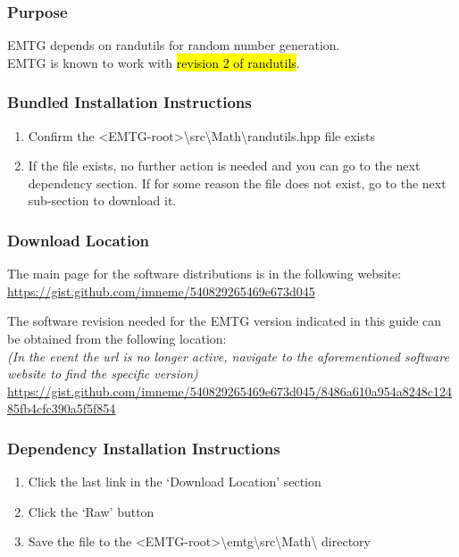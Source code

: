 
\subsubsection{Purpose}
\ac{EMTG} depends on randutils for random number generation. \\ \ac{EMTG} is known to work with \hl{revision 2 of randutils}.

\subsubsection{Bundled Installation Instructions}

\begin{enumerate}
	\item Confirm the \textless EMTG-root\textgreater \textbackslash src\textbackslash Math\textbackslash randutils.hpp \hspace{1pt} file exists
	\item If the file exists, no further action is needed and you can go to the next dependency section. If for some reason the file does not exist, go to the next sub-section to download it.
\end{enumerate}

\subsubsection{Download Location}
\noindent The main page for the software distributions is in the following website: \\
\url{https://gist.github.com/imneme/540829265469e673d045}

\noindent The software revision needed for the EMTG version indicated in this guide can be obtained from the following location: \\
\emph{(In the event the url is no longer active, navigate to the aforementioned software website to find the specific version)} \\
\url{https://gist.github.com/imneme/540829265469e673d045/8486a610a954a8248c12485fb4cfc390a5f5f854}

\subsubsection{Dependency Installation Instructions}
\begin{enumerate}
	\item Click the last link in the ‘Download Location’ section
	\item Click the ‘Raw’ button
	\item Save the file to the \textless EMTG-root\textgreater \textbackslash emtg\textbackslash src\textbackslash Math\textbackslash \hspace{1pt} directory
\end{enumerate}